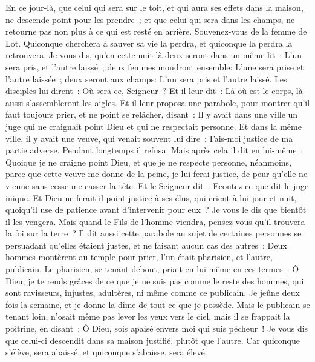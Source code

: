 \begin{multicols}{2}
En ce jour-là, que celui qui sera sur le toit, et qui aura ses effets dans la maison, ne descende point pour les prendre~; et que celui qui sera dans les champs, ne retourne pas non plus à ce qui est resté en arrière.
Souvenez-vous de la femme de Lot.
Quiconque cherchera à sauver sa vie la perdra, et quiconque la perdra la retrouvera.
Je vous dis, qu'en cette nuit-là deux seront dans un même lit~: L'un sera pris, et l'autre laissé~;
deux femmes moudront ensemble: L'une sera prise et l'autre laissée~;
deux seront aux champs: L'un sera pris et l'autre laissé.
Les disciples lui dirent~: Où sera-ce, Seigneur~? Et il leur dit~: Là où est le corps, là aussi s'assembleront les aigles.
\VerseOne{}Et il leur proposa une parabole, pour montrer qu'il faut toujours prier, et ne point se relâcher,
disant~: Il y avait dans une ville un juge qui ne craignait point Dieu et qui ne respectait personne.
Et dans la même ville, il y avait une veuve, qui venait souvent lui dire~: Fais-moi justice de ma partie adverse.
Pendant longtemps il refusa. Mais après cela il dit en lui-même~: Quoique je ne craigne point Dieu, et que je ne respecte personne,
néanmoins, parce que cette veuve me donne de la peine, je lui ferai justice, de peur qu'elle ne vienne sans cesse me casser la tête.
Et le Seigneur dit~: Ecoutez ce que dit le juge inique.
Et Dieu ne ferait-il point justice à ses élus, qui crient à lui jour et nuit, quoiqu'il use de patience avant d'intervenir pour eux~?
Je vous le dis que bientôt il les vengera. Mais quand le Fils de l'homme viendra, pensez-vous qu'il trouvera la foi sur la terre~?
Il dit aussi cette parabole au sujet de certaines personnes se persuadant qu'elles étaient justes, et ne faisant aucun cas des autres~:
Deux hommes montèrent au temple pour prier, l'un était pharisien, et l'autre, publicain.
Le pharisien, se tenant debout, priait en lui-même en ces termes~: Ô Dieu, je te rends grâces de ce que je ne suis pas comme le reste des hommes, qui sont ravisseurs, injustes, adultères, ni même comme ce publicain.
Je jeûne deux fois la semaine, et je donne la dîme de tout ce que je possède.
Mais le publicain se tenant loin, n'osait même pas lever les yeux vers le ciel, mais il se frappait la poitrine, en disant~: Ô Dieu, sois apaisé envers moi qui suis pécheur~!
Je vous dis que celui-ci descendit dans sa maison justifié, plutôt que l'autre. Car quiconque s'élève, sera abaissé, et quiconque s'abaisse, sera élevé.

\end{multicols}
